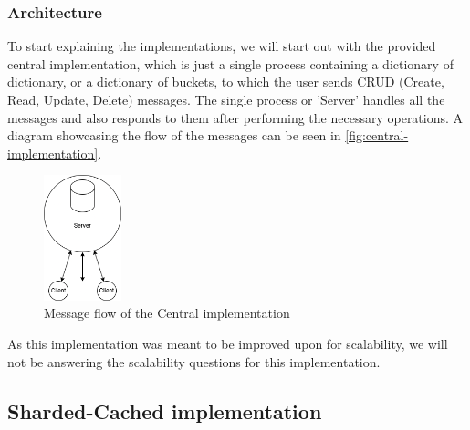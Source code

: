 \documentclass{article}
\begin{document}
\subsubsection{Architecture}
To start explaining the implementations, we will start out with the provided
central implementation, which is just a single process containing a dictionary
of dictionary, or a dictionary of buckets, to which the user sends CRUD (Create,
Read, Update, Delete) messages. The single process or 'Server' handles all the
messages and also responds to them after performing the necessary operations. A
diagram showcasing the flow of the messages can be seen in
\autoref{fig:central-implementation}.
\begin{figure}[h!]
	\centering
	\includegraphics[width=0.2\textwidth]{central.png}
	\caption{Message flow of the Central implementation}
	\label{fig:central-implementation}
\end{figure}
As this implementation was meant to be improved upon for scalability, we will not be
answering the scalability questions for this implementation.
\newpage
\subsection{Sharded-Cached implementation}
\end{document}
